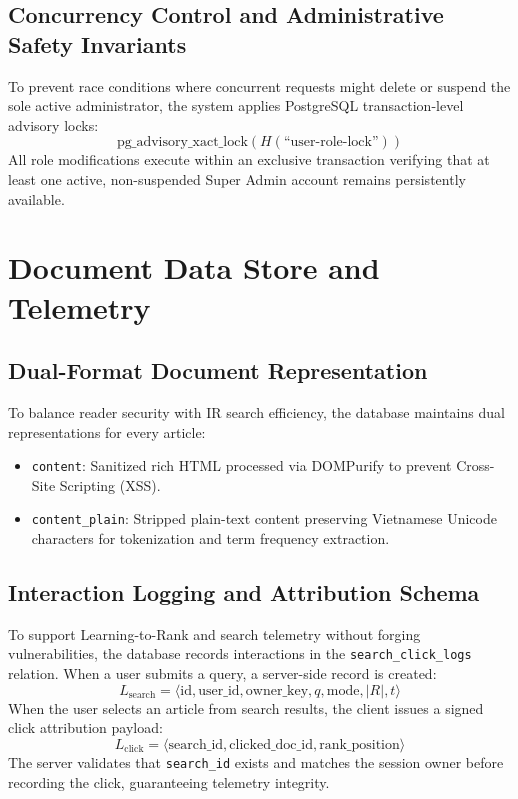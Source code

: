 \documentclass[conference]{IEEEtran}
\begin{document}
\subsection{Concurrency Control and Administrative Safety Invariants}
To prevent race conditions where concurrent requests might delete or suspend the sole active administrator, the system applies PostgreSQL transaction-level advisory locks:
\begin{equation}
\text{pg\_advisory\_xact\_lock}(H(\text{``user-role-lock''}))
\end{equation}
All role modifications execute within an exclusive transaction verifying that at least one active, non-suspended Super Admin account remains persistently available.

\section{Document Data Store and Telemetry}
\subsection{Dual-Format Document Representation}
To balance reader security with IR search efficiency, the database maintains dual representations for every article:
\begin{itemize}
    \item \texttt{content}: Sanitized rich HTML processed via DOMPurify to prevent Cross-Site Scripting (XSS).
    \item \texttt{content\_plain}: Stripped plain-text content preserving Vietnamese Unicode characters for tokenization and term frequency extraction.
\end{itemize}

\subsection{Interaction Logging and Attribution Schema}
To support Learning-to-Rank and search telemetry without forging vulnerabilities, the database records interactions in the \texttt{search\_click\_logs} relation. When a user submits a query, a server-side record is created:
\begin{equation}
L_{\text{search}} = \langle \text{id}, \text{user\_id}, \text{owner\_key}, q, \text{mode}, |R|, t \rangle
\end{equation}
When the user selects an article from search results, the client issues a signed click attribution payload:
\begin{equation}
L_{\text{click}} = \langle \text{search\_id}, \text{clicked\_doc\_id}, \text{rank\_position} \rangle
\end{equation}
The server validates that \texttt{search\_id} exists and matches the session owner before recording the click, guaranteeing telemetry integrity.
\end{document}
